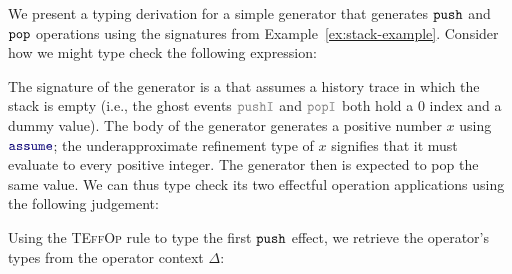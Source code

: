 \begin{example}
  \label{ex:operator-application-typing}
  We present a typing derivation for a simple generator that generates
  $\boldsymbol{{\tt push}}$ and $\boldsymbol{{\tt pop}}$ operations using the signatures from
  Example~\ref{ex:stack-example}. Consider how we might type check the
  following expression: %
  \vspace{-.4cm} \par{}%
  \noindent
  The signature of the generator is a \tyName{} that assumes a history
  trace in which the stack is empty (i.e., the ghost events
  $\effGray{pushI}$ and $\effGray{popI}$ both hold a $0$ index and a
  dummy value).  The body of the generator generates a positive number
  $x$ using $\mykw{assume}$; the underapproximate refinement type of
  $x$ signifies that it must evaluate to every positive integer. The
  generator then is expected to pop the same value.  We can thus type
  check its two effectful operation applications using the following
  judgement: %
  \vspace{-.4cm} \par{}%
  \noindent
  Using the \textsc{TEffOp} rule to type the first $\boldsymbol{{\tt push}}$
  effect, we retrieve the operator's types from the operator context
  $\Delta$:%
  \vspace{-.4cm} \par{}
\end{example}
